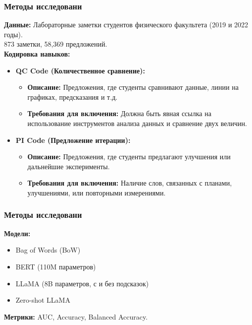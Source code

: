 \documentclass[aspectratio=169]{beamer}
\begin{document}
\begin{frame}
    \frametitle{Методы исследовани}
    \textbf{Данные:} Лабораторные заметки студентов физического факультета (2019 и 2022 годы). \\
    873 заметки, 58,369 предложений. \\
    \textbf{Кодировка навыков:} 
    \begin{itemize}
    \item \textbf{QC Code (Количественное сравнение):}
    \begin{itemize}
        \item \textbf{Описание:} Предложения, где студенты сравнивают данные, линии на графиках, предсказания и т.д.
        \item \textbf{Требования для включения:} Должна быть явная ссылка на использование инструментов анализа данных и сравнение двух величин.
    \end{itemize}
    \item \textbf{PI Code (Предложение итерации):}
    \begin{itemize}
        \item \textbf{Описание:} Предложения, где студенты предлагают улучшения или дальнейшие эксперименты.
        \item \textbf{Требования для включения:} Наличие слов, связанных с планами, улучшениями, или повторными измерениями.
    \end{itemize}
\end{itemize}
\end{frame}

\begin{frame}
    \frametitle{Методы исследовани}
    \textbf{Модели:} \\
    \begin{itemize}
        \item Bag of Words (BoW)
        \item BERT (110M параметров)
        \item LLaMA (8B параметров, с и без подсказок)
        \item Zero-shot LLaMA
    \end{itemize}
    \textbf{Метрики:} AUC, Accuracy, Balanced Accuracy.
\end{frame}
\end{document}
